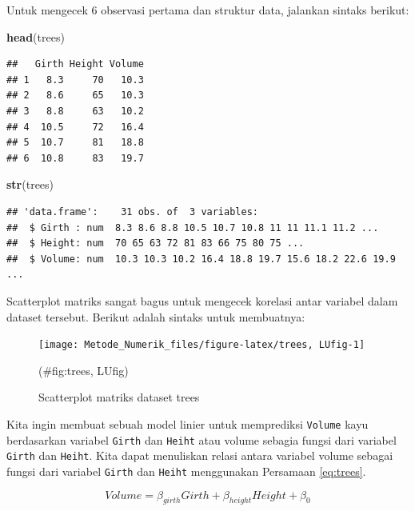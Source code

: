 \documentclass[]{book}
\newenvironment{Shaded}{\begin{snugshade}}{\end{snugshade}}
\newcommand{\KeywordTok}[1]{\textcolor[rgb]{0.13,0.29,0.53}{\textbf{#1}}}
\newcommand{\NormalTok}[1]{#1}
\theoremstyle{definition}
\theoremstyle{definition}
\theoremstyle{definition}
\theoremstyle{remark}
\begin{document}
Untuk mengecek 6 observasi pertama dan struktur data, jalankan sintaks berikut:

\begin{Shaded}
\begin{Highlighting}[]
\KeywordTok{head}\NormalTok{(trees)}
\end{Highlighting}
\end{Shaded}

\begin{verbatim}
##   Girth Height Volume
## 1   8.3     70   10.3
## 2   8.6     65   10.3
## 3   8.8     63   10.2
## 4  10.5     72   16.4
## 5  10.7     81   18.8
## 6  10.8     83   19.7
\end{verbatim}

\begin{Shaded}
\begin{Highlighting}[]
\KeywordTok{str}\NormalTok{(trees)}
\end{Highlighting}
\end{Shaded}

\begin{verbatim}
## 'data.frame':    31 obs. of  3 variables:
##  $ Girth : num  8.3 8.6 8.8 10.5 10.7 10.8 11 11 11.1 11.2 ...
##  $ Height: num  70 65 63 72 81 83 66 75 80 75 ...
##  $ Volume: num  10.3 10.3 10.2 16.4 18.8 19.7 15.6 18.2 22.6 19.9 ...
\end{verbatim}

Scatterplot matriks sangat bagus untuk mengecek korelasi antar variabel dalam dataset tersebut. Berikut adalah sintaks untuk membuatnya:

\begin{figure}

{\centering \texttt{[image: Metode\_Numerik\_files/figure-latex/trees, LUfig-1]} 

}

\caption{Scatterplot matriks dataset trees}(\#fig:trees, LUfig)
\end{figure}

Kita ingin membuat sebuah model linier untuk memprediksi \texttt{Volume} kayu berdasarkan variabel \texttt{Girth} dan \texttt{Heiht} atau volume sebagia fungsi dari variabel \texttt{Girth} dan \texttt{Heiht}. Kita dapat menuliskan relasi antara variabel volume sebagai fungsi dari variabel \texttt{Girth} dan \texttt{Heiht} menggunakan Persamaan \eqref{eq:trees}.

\begin{equation}
Volume=\beta_{girth} Girth+\beta_{height}Height+\beta_0
 \label{eq:trees}
\end{equation}
\end{document}
